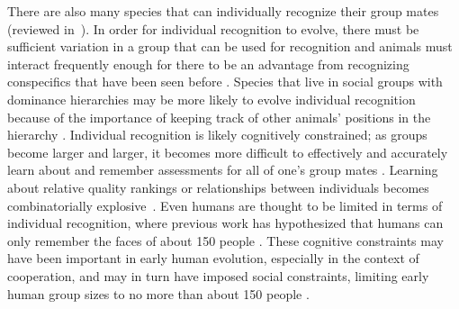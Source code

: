 There are also many species that can individually recognize their group mates (reviewed in~\cite{Tibbetts2007IndividualDifferent,Wiley2013SpecificityBehaviour}). In order for individual recognition to evolve, there must be sufficient variation in a group that can be used for recognition and animals must interact frequently enough for there to be an advantage from recognizing conspecifics that have been seen before \cite{Sheehan:2014fk,Whitfield:1987tg}. Species that live in social groups with dominance hierarchies may be more likely to evolve individual recognition because of the importance of keeping track of other animals' positions in the hierarchy \cite{Barnard:1979fk,Whitfield:1987tg}. Individual recognition is likely cognitively constrained; as groups become larger and larger, it becomes more difficult to effectively and accurately learn about and remember assessments for all of one's group mates \cite{Rohwer:1982fk,Solberg:1997uq}. Learning about relative quality rankings or relationships between individuals becomes combinatorially explosive~\cite{Seyfarth2015SocialCognition}. Even humans are thought to be limited in terms of individual recognition, where previous work has hypothesized that humans can only remember the faces of about 150 people \cite{Dunbar:1993zr,Hill:2003ly}. These cognitive constraints may have been important in early human evolution, especially in the context of cooperation, and may in turn have imposed social constraints, limiting early human group sizes to no more than about 150 people \cite{Dunbar:1993zr,Dunbar:1992ys}.


